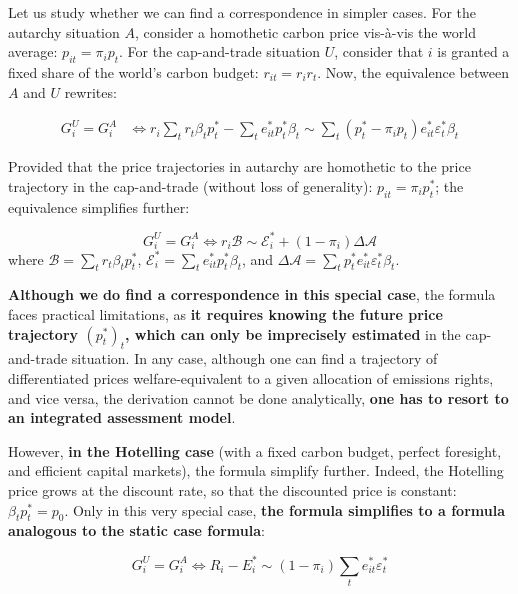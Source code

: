 \documentclass[12pt,english]{article}
\begin{document}
Let us study whether we can find a correspondence in simpler cases. For
the autarchy situation $A$, consider a homothetic carbon price
vis-à-vis the world average: $p_{it}=\pi_i p_t$. For the cap-and-trade
situation $U$, consider that $i$ is granted a fixed share of the
world's carbon budget: $r_{it}=r_ir_t$. Now, the equivalence between
$A$ and $U$ rewrites:

$$\begin{aligned}
G^U_i = G^A_i &\Leftrightarrow r_i \sum_t r_{t} \beta_t p^*_t - \sum_t e^*_{it} p^*_t \beta_t \sim \sum_t (p^*_t - \pi_i p_t) e^*_{it}  \varepsilon^*_t \beta_t  
\end{aligned}$$

Provided that the price trajectories in autarchy are homothetic to the
price trajectory in the cap-and-trade (without loss of generality):
$p_{it}=\pi_i p^*_t$; the equivalence simplifies further:

$$G^U_i = G^A_i \Leftrightarrow r_i \mathscr{B} \sim \mathscr{E}^*_i + (1 - \pi_i) \Delta \mathscr{A}$$
where $\mathscr{B} = \sum_t r_{t} \beta_t p^*_t$,
$\mathscr{E}^*_i = \sum_t e^*_{it} p^*_t \beta_t$, and
$\Delta \mathscr{A} = \sum_t p^*_t e^*_{it}  \varepsilon^*_t \beta_t $.

\textbf{Although we do find a correspondence in this special case}, the
formula faces practical limitations, as \textbf{it requires knowing the
future price trajectory $(p^*_t)_t$, which can only be imprecisely
estimated} in the cap-and-trade situation. In any case, although one can
find a trajectory of differentiated prices welfare-equivalent to a given
allocation of emissions rights, and vice versa, the derivation cannot be
done analytically, \textbf{one has to resort to an integrated assessment
model}.

However, \textbf{in the Hotelling case} (with a fixed carbon budget,
perfect foresight, and efficient capital markets), the formula simplify
further. Indeed, the Hotelling price grows at the discount rate, so that
the discounted price is constant: $\beta_t p^*_t = p_0$. Only in this
very special case, \textbf{the formula simplifies to a formula analogous
to the static case formula}:

$$G^U_i = G^A_i \Leftrightarrow R_i - E^*_i \sim (1 - \pi_i) \sum_t e^*_{it}  \varepsilon^*_t$$
\end{document}
